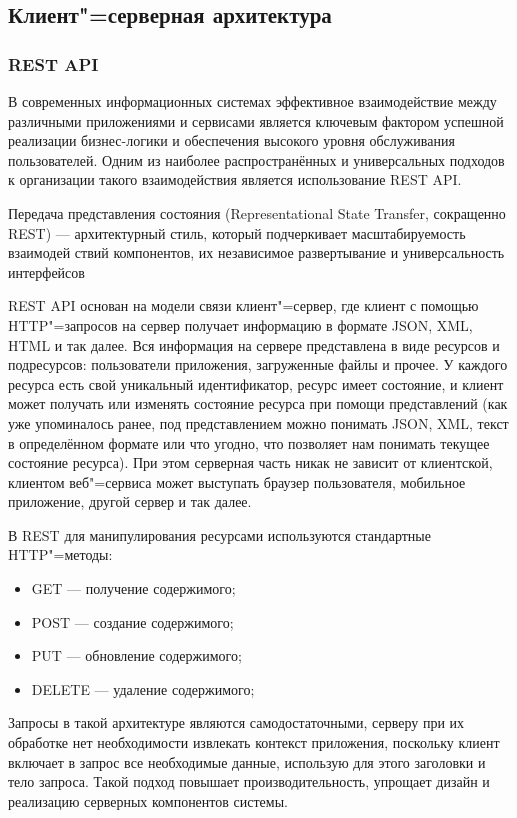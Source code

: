 \subsection{Клиент"=серверная архитектура}

\subsubsection{REST API}
В современных информационных системах эффективное взаимодействие между различными приложениями и сервисами является ключевым фактором успешной реализации бизнес-логики и обеспечения высокого уровня обслуживания пользователей. Одним из наиболее распространённых и универсальных подходов к организации такого взаимодействия является использование REST API.

Передача представления состояния (Representational State Transfer, сокращенно REST) --- архитектурный стиль, который подчеркивает масштабируемость взаимодей ствий компонентов, их независимое развертывание и универсальность интерфейсов \cite{RestAPI3}

REST API основан на модели связи клиент"=сервер, где клиент с помощью HTTP"=запросов на сервер получает информацию в формате JSON, XML, HTML и так далее. Вся информация на сервере представлена в виде ресурсов и подресурсов: пользователи приложения, загруженные файлы и прочее. У каждого ресурса есть свой уникальный идентификатор, ресурс имеет состояние, и клиент может получать или изменять состояние ресурса при помощи представлений (как уже упоминалось ранее, под представлением можно понимать JSON, XML, текст в определённом формате или что угодно, что позволяет нам понимать текущее состояние ресурса). При этом серверная часть никак не зависит от клиентской, клиентом веб"=сервиса может выступать браузер пользователя, мобильное приложение, другой сервер и так далее. \cite{RestAPI2}

В REST для манипулирования ресурсами используются стандартные HTTP"=методы:
\begin{itemize}
	\item{GET --- получение содержимого;}
	\item{POST --- создание содержимого;}
	\item{PUT --- обновление содержимого;}
	\item{DELETE --- удаление содержимого;}
\end{itemize}

Запросы в такой архитектуре являются самодостаточными, серверу при их обработке нет необходимости извлекать контекст приложения, поскольку клиент включает в запрос все необходимые данные, использую для этого заголовки и тело запроса. Такой подход повышает производительность, упрощает дизайн и реализацию серверных компонентов системы. \cite{RestAPI1}

